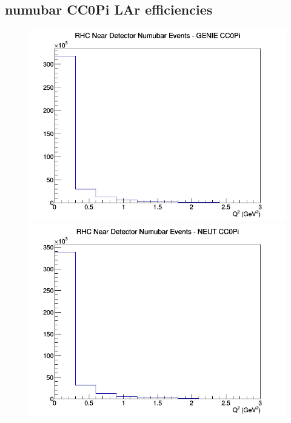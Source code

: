 \subsection{numubar CC0Pi LAr efficiencies}
\begin{figure}[h]
\includegraphics[width=\linewidth]{eff_Q2/LAr/CC0Pi_RHC_ND_numubar_Q2_GENIE.png}
\endminipage
{}
\includegraphics[width=\linewidth]{eff_Q2/LAr/CC0Pi_RHC_ND_numubar_Q2_NEUT.png}
\endminipage
{}

\end{figure}
